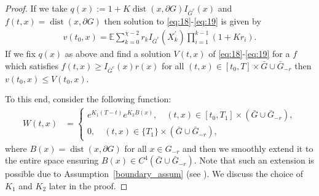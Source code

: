 \documentclass{article}
\theoremstyle{definition}
\DeclareMathOperator{\dist}{dist}
\numberwithin{equation}{section}
\begin{document}
\begin{proof}
    If we take $q (x) := 1 + K\dist(x, \partial G) I_{\bar{G}^{c}}(x)$ and $ f(t,x) = \dist(x, \partial G) $ then solution to \eqref{eq:18}-\eqref{eq:19} is given by
    \begin{align*}
        v(t_0, x) = \mathbb{E}\sum_{k=0}^{\chi-2}r_{k}I_{\bar{G}^c}(X_{k}^{'}) \prod_{i=1}^{k-1}(1 + K r_{i}).
    \end{align*}
If we fix $q(x) $ as above and find a solution  $V(t,x) $  of \eqref{eq:18}-\eqref{eq:19} for a $f$ which satisfies $f(t,x) \geq I_{\bar{G}^c}(x)r(x)$ for all $(t,x) \in [t_0, T]\times \bar{G} \cup \bar{G}_{-r}$ then $v(t_0,x) \leq V(t_0, x) $. 
    
 To this end, consider the following function: 
 \begin{align}
     W(t, x) &= \begin{cases}
         e^{K_1 (T-t)} e^{K_2 B(x)},\quad  (t,x) \in [t_0, T_1] \times (\bar{G}\cup \bar{G}_{-r}),\\
         0, \quad (t,x) \in \{T_1\} \times (\bar{G}\cup \bar{G}_{-r}),
     \end{cases}
 \end{align}
where $B(x) = \dist(x,\partial G)$ for all $x \in G_{-r}$ and then we smoothly extend it to the entire space ensuring $B(x) \in C^4(\bar{G} \cup \bar{G}_{-r})$. Note that such an extension is possible due to Assumption~\ref{boundary_assum} (see \cite[Lemma~6.37]{gilbarg_trudinger}). We discuss the choice of $K_1$ and $K_2$ later in the proof. 


\end{proof}
\end{document}
